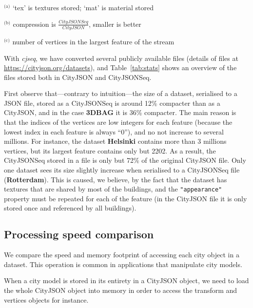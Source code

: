 \documentclass{isprs} %
\begin{document}
\begin{table}
\begin{threeparttable}
\begin{tabular}
    \bottomrule
  \end{tabular}
    \begin{tablenotes}[flushleft]
      \footnotesize
      \item ${}^{\text{(a)}}$ `tex' is textures stored; `mat' is material stored
      \item ${}^{\text{(b)}}$ compression is $\frac{CityJSONSeq}{CityJSON}$, smaller is better
      \item ${}^{\text{(c)}}$ number of vertices in the largest feature of the stream
    \end{tablenotes}
  \end{threeparttable}
\end{table}

With \emph{cjseq}, we have converted several publicly available files (details of files at \url{https://cityjson.org/datasets}), and Table~\ref{tab:stats} shows an overview of the files stored both in CityJSON and CityJSONSeq.

First observe that---contrary to intuition---the size of a dataset, serialised to a JSON file, stored as a CityJSONSeq is around 12\% compacter than as a CityJSON, and in the case \textbf{3DBAG} it is 36\% compacter.
The main reason is that the indices of the vertices are low integers for each feature (because the lowest index in each feature is always ``0''), and no not increase to several millions.
For instance, the dataset \textbf{Helsinki} contains more than 3 millions vertices, but its largest feature contains only but 2202.
As a result, the CityJSONSeq stored in a file is only but 72\% of the original CityJSON file.
Only one dataset sees its size slightly increase when serialised to a CityJSONSeq file (\textbf{Rotterdam}).
This is caused, we believe, by the fact that the dataset has textures that are shared by most of the buildings, and the \texttt{"appearance"} property must be repeated for each of the feature (in the CityJSON file it is only stored once and referenced by all buildings).


\subsection{Processing speed comparison}

We compare the speed and memory footprint of accessing each city object in a dataset.
This operation is common in applications that manipulate city models.

When a city model is stored in its entirety in a CityJSON object, we need to load the whole CityJSON object into memory in order to access the transform and vertices objects for instance.
\end{document}
